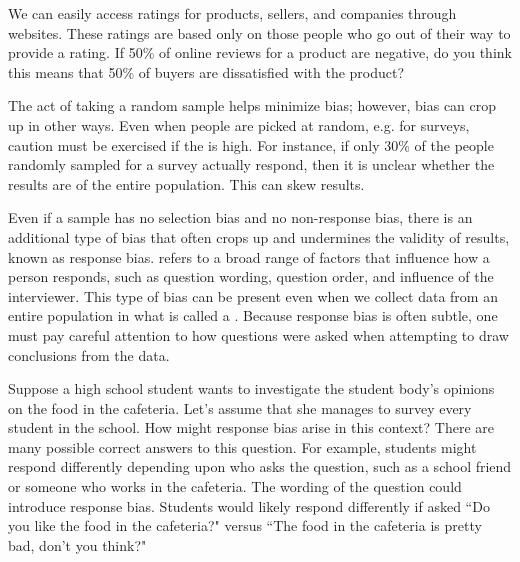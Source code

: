 \begin{exercisewrap}
\begin{nexercise}
We can easily access ratings for products, sellers, and companies through websites. These ratings are based only on those people who go out of their way to provide a rating. If 50\% of online reviews for a product are negative, do you think this means that 50\% of buyers are dissatisfied with the product?\footnotemark
\end{nexercise}
\end{exercisewrap}

The act of taking a random sample helps minimize bias; however, bias can crop up in other ways. Even when people are picked at random, e.g. for surveys, caution must be exercised if the   is high. For instance, if only 30\% of the people randomly sampled for a survey actually respond, then it is unclear whether the results are  of the entire population. This   can skew results.

Even if a sample has no selection bias and no non-response bias, there is an additional type of bias that often crops up and undermines the validity of results, known as response bias.  refers to a broad range of factors that influence how a person responds, such as question wording, question order, and influence of the interviewer. This type of bias can be present even when we collect data from an entire population in what is called a . Because response bias is often subtle, one must pay careful attention to how questions were asked when attempting to draw conclusions from the data.

\begin{examplewrap}
\begin{nexample}{Suppose a high school student wants to investigate the student body's opinions on the food in the cafeteria. Let's assume that she manages to survey every student in the school. How might response bias arise in this context?}
There are many possible correct answers to this question. For example, students might respond differently depending upon who asks the question, such as a school friend or someone who works in the cafeteria. The wording of the question could introduce response bias. Students would likely respond differently if asked ``Do you like the food in the cafeteria?" versus ``The food in the cafeteria is pretty bad, don't you think?"
\end{nexample}
\end{examplewrap}

